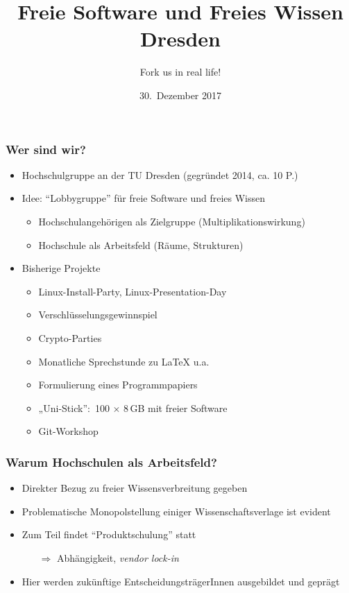 \documentclass{beamer}
\title{Freie Software und Freies Wissen Dresden}
\subtitle{Fork us in real life!}
\date{30.~Dezember 2017}
\begin{document}
\begin{frame}
  \maketitle
\end{frame}

\begin{frame}
  \frametitle{Wer sind wir?}
  \onslide<+->
  \begin{itemize}
  \item Hochschulgruppe an der TU Dresden (gegründet 2014, ca. 10 P.)
  \item Idee: \enquote{Lobbygruppe} für freie Software und freies Wissen
    \begin{itemize}
    \item Hochschulangehörigen als Zielgruppe (Multiplikationswirkung)
    \item Hochschule als Arbeitsfeld (Räume, Strukturen)
    \end{itemize}
    \bigskip\onslide<+->
  \item Bisherige Projekte
    \begin{itemize}
    \item Linux-Install-Party, Linux-Presentation-Day
    \item Verschlüsselungsgewinnspiel
    \item Crypto-Parties
    \item Monatliche Sprechstunde zu \LaTeX{} u.a.
    \item Formulierung eines Programmpapiers
    \item „Uni-Stick”:~100 $\times$ 8\,GB mit freier Software
    \item Git-Workshop
    \end{itemize}
  \end{itemize}
\end{frame}

\begin{frame}
  \frametitle{Warum Hochschulen als Arbeitsfeld?}
  \begin{itemize}
  \item<1-> Direkter Bezug zu freier Wissensverbreitung gegeben
  \item<2-> Problematische Monopolstellung einiger Wissenschaftsverlage
    ist evident
  \item<3-> Zum Teil findet \enquote{Produktschulung} statt
    \begin{itemize}
    \item[$\Rightarrow$] Abhängigkeit, \emph{vendor lock-in}
    \end{itemize}
  \item<4-> Hier werden zukünftige EntscheidungsträgerInnen ausgebildet
    und geprägt
  \end{itemize}
\end{frame}
\end{document}
